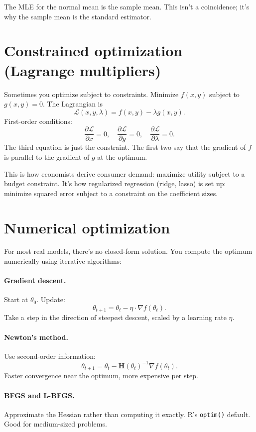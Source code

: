The MLE for the normal mean is the sample mean. This isn't a coincidence; it's why the sample mean is the standard estimator.

\section{Constrained optimization (Lagrange multipliers)}

Sometimes you optimize subject to constraints. Minimize $f(x, y)$ subject to $g(x, y) = 0$. The Lagrangian is
\[
  \mathcal{L}(x, y, \lambda) = f(x, y) - \lambda g(x, y).
\]
First-order conditions:
\[
  \frac{\partial \mathcal{L}}{\partial x} = 0, \quad \frac{\partial \mathcal{L}}{\partial y} = 0, \quad \frac{\partial \mathcal{L}}{\partial \lambda} = 0.
\]
The third equation is just the constraint. The first two say that the gradient of $f$ is parallel to the gradient of $g$ at the optimum.

This is how economists derive consumer demand: maximize utility subject to a budget constraint. It's how regularized regression (ridge, lasso) is set up: minimize squared error subject to a constraint on the coefficient sizes.

\section{Numerical optimization}

For most real models, there's no closed-form solution. You compute the optimum numerically using iterative algorithms:

\paragraph{Gradient descent.} Start at $\theta_0$. Update:
\[
  \theta_{t+1} = \theta_t - \eta \cdot \nabla f(\theta_t).
\]
Take a step in the direction of steepest descent, scaled by a learning rate $\eta$.

\paragraph{Newton's method.} Use second-order information:
\[
  \theta_{t+1} = \theta_t - \bm{H}(\theta_t)^{-1} \nabla f(\theta_t).
\]
Faster convergence near the optimum, more expensive per step.

\paragraph{BFGS and L-BFGS.} Approximate the Hessian rather than computing it exactly. R's \texttt{optim()} default. Good for medium-sized problems.

